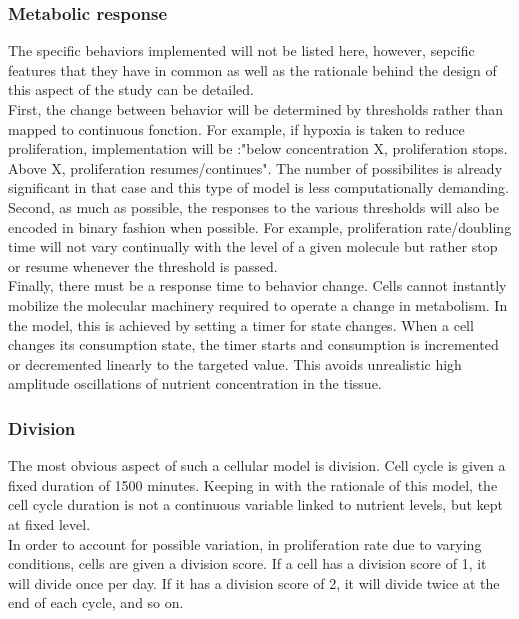 \documentclass[11pt,a4paper]{article}
\begin{document}
\subsubsection{Metabolic response}
The specific behaviors implemented will not be listed here, however, sepcific features that they have in common as well as the rationale  behind the design of this aspect of the study can be detailed. \\

First, the change between behavior will be determined by thresholds rather than mapped to continuous fonction. For example, if hypoxia is taken to reduce proliferation, implementation will be :"below concentration X, proliferation stops. Above X, proliferation resumes/continues". The number of possibilites is already significant in that case and this type of model is less computationally demanding.\\

Second, as much as possible, the responses to the various thresholds will also be encoded in binary fashion when possible. For example, proliferation rate/doubling time will not vary continually with the level of a given molecule but rather stop or resume whenever the threshold is passed.\\

Finally, there must be a response time to behavior change. Cells cannot instantly mobilize the molecular machinery required to operate a change in metabolism. In the model, this is achieved by setting a timer for state changes. When a cell changes its consumption state, the timer starts and consumption is incremented or decremented linearly to the targeted value. This avoids unrealistic high amplitude oscillations of nutrient concentration in the tissue.
 
\subsubsection{Division}
The most obvious aspect of such a cellular model is division. Cell cycle is given a fixed duration of 1500 minutes. Keeping in with the rationale of this model, the cell cycle duration is not a continuous variable linked to nutrient levels, but kept at fixed level.\\

In order to account for possible variation, in proliferation rate due to varying conditions, cells are given a division score. If a cell has a division score of 1, it will divide once per day. If it has a division score of 2, it will divide twice at the end of each cycle, and so on.\\
\end{document}
